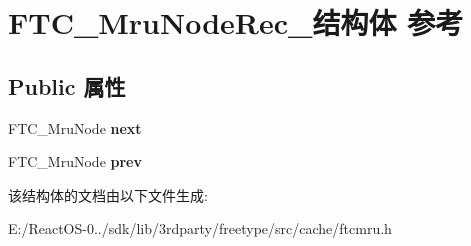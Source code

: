 \hypertarget{struct_f_t_c___mru_node_rec__}{}\section{F\+T\+C\+\_\+\+Mru\+Node\+Rec\+\_\+结构体 参考}
\label{struct_f_t_c___mru_node_rec__}
\subsection*{Public 属性}
\begin{DoxyCompactItemize}
\item 
\mbox{\label{struct_f_t_c___mru_node_rec___a49f8fd3f2aa98a0e33d65314b69bea4c}} 
F\+T\+C\+\_\+\+Mru\+Node {\bfseries next}
\item 
\mbox{\label{struct_f_t_c___mru_node_rec___a3fa5127bff373596d2374c0524e7f0ed}} 
F\+T\+C\+\_\+\+Mru\+Node {\bfseries prev}
\end{DoxyCompactItemize}


该结构体的文档由以下文件生成\+:\begin{DoxyCompactItemize}
\item 
E\+:/\+React\+O\+S-\/0../sdk/lib/3rdparty/freetype/src/cache/ftcmru.\+h\end{DoxyCompactItemize}
